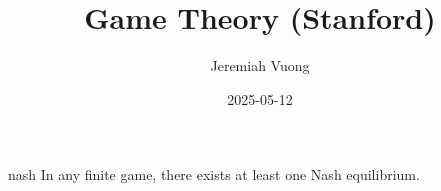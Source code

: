 \documentclass{article}
\title{Game Theory (Stanford)}
\author{Jeremiah Vuong}
\date{2025-05-12}
\begin{document}
\maketitle
\tableofcontents


\begin{theorem}{nash}
In any finite game, there exists at least one Nash equilibrium.
\end{theorem}
\end{document}
